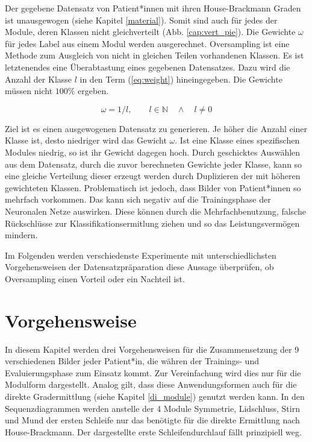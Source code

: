 Der gegebene Datensatz von Patient*innen mit ihren House-Brackmann Graden ist unausgewogen (siehe Kapitel \ref{material}). Somit sind auch für jedes der Module, deren Klassen nicht gleichverteilt (Abb. \ref{cap:vert_pie}). Die Gewichte $\omega$ für jedes Label aus einem Modul werden ausgerechnet. Oversampling ist eine Methode zum Ausgleich von nicht in gleichen Teilen vorhandenen Klassen. Es ist letztenendes eine Überabtastung eines gegebenen Datensatzes. Dazu wird die Anzahl der Klasse $l$ in den Term (\ref{eq:weight}) hineingegeben. Die Gewichte müssen nicht $100\%$ ergeben.

\begin{equation}
\omega = 1 / l, \qquad l \in \mathbb{N} \quad \land \quad l \neq 0 \label{eq:weight}
\end{equation}

Ziel ist es einen ausgewogenen Datensatz zu generieren. Je höher die Anzahl einer Klasse ist, desto niedriger wird das Gewicht $\omega$. Ist eine Klasse eines spezifischen Modules niedrig, so ist ihr Gewicht dagegen hoch. Durch geschicktes Auswählen aus dem Datensatz, durch die zuvor berechneten Gewichte jeder Klasse, kann so eine gleiche Verteilung dieser erzeugt werden durch Duplizieren der mit höheren gewichteten Klassen. Problematisch ist jedoch, dass Bilder von Patient*innen so mehrfach vorkommen. Das kann sich negativ auf die Trainingsphase der Neuronalen Netze auswirken. Diese können durch die Mehrfachbenutzung, falsche Rückschlüsse zur Klassifikationsermitlung ziehen und so das Leistungsvermögen mindern.

Im Folgenden werden verschiedenste Experimente mit unterschiedlichsten Vorgehensweisen der Datensatzpräparation diese Aussage überprüfen, ob Oversampling einen Vorteil oder ein Nachteil ist.



\clearpage
\section{Vorgehensweise}\label{process}
In diesem Kapitel werden drei Vorgehensweisen für die Zusammensetzung der 9 verschiedenen Bilder jeder Patient*in, die währen der Trainings- und Evaluierungsphase zum Einsatz kommt. Zur Vereinfachung wird dies nur für die Modulform dargestellt. Analog gilt, dass diese Anwendungsformen auch für die direkte Gradermittlung (siehe Kapitel \ref{di_module}) genutzt werden kann. In den Sequenzdiagrammen werden anstelle der 4 Module Symmetrie, Lidschluss, Stirn und Mund der ersten Schleife nur das benötigte für die direkte Ermittlung nach House-Brackmann. Der dargestellte erste Schleifendurchlauf fällt prinzipiell weg.

